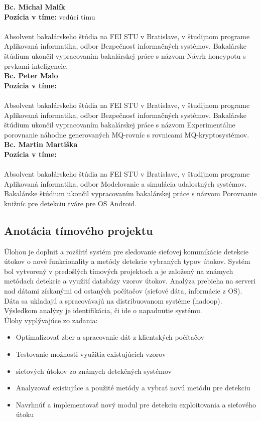 \documentclass[a4paper,12pt]{article}
\begin{document}
\noindent \textbf{Bc. Michal Malík} \\
\textbf{Pozícia v tíme: } vedúci tímu \\ \\
Absolvent bakalárskeho štúdia na FEI STU v Bratislave, v študijnom programe Aplikovaná informatika, odbor Bezpečnosť informačných systémov. Bakalárske štúdium ukončil vypracovaním bakalárskej práce s názvom Návrh honeypotu s prvkami inteligencie. \\ 

\noindent \textbf{Bc. Peter Malo} \\
\textbf{Pozícia v tíme: } \\ \\
Absolvent bakalárskeho štúdia na FEI STU v Bratislave, v študijnom programe Aplikovaná informatika, odbor Bezpečnosť informačných systémov. Bakalárske štúdium ukončil vypracovaním bakalárskej práce s názvom Experimentálne porovnanie náhodne generovaných MQ-rovníc s rovnicami MQ-kryptosystémov. \\ 

\noindent \textbf{Bc. Martin Martiška} \\
\textbf{Pozícia v tíme: }\\ \\
Absolvent bakalárskeho štúdia na FEI STU v Bratislave, v študijnom programe Aplikovaná informatika, odbor Modelovanie a simulácia udalostných systémov. Bakalárske štúdium ukončil vypracovaním bakalárskej práce s názvom Porovnanie knižníc pre detekciu tváre pre OS Android. \\ 

\subsection{Anotácia tímového projektu}
Úlohou je doplniť a rozšíriť systém pre sledovanie sieťovej komunikácie detekcie útokov o nové funkcionality a metódy detekcie vybraných typov útokov. Systém bol vytvorený v predošlých tímových projektoch a je založený na známych metódach detekcie a využití databázy vzorov útokov. Analýza prebieha na serveri nad dátami získanými od ostaných počítačov (sieťové dáta, informácie z OS). Dáta sa ukladajú a spracovávajú na distribuovanom systéme (hadoop). Výsledkom analýzy je identifikácia, či ide o napadnutie systému. \\

Úlohy vyplývajúce zo zadania: 
\begin{itemize}
	\item Optimalizovať zber a spracovanie dát z klientských počítačov 
	\item Testovanie možnosti využitia existujúcich vzorov  \item sieťových útokov zo známych detekčných systémov 
	\item Analyzovať existujúce a použité metódy a vybrať novú metódu pre detekciu 
	\item Navrhnúť a implementovať nový modul pre detekciu exploitovania a sieťového útoku \\
\end{itemize}
\end{document}
